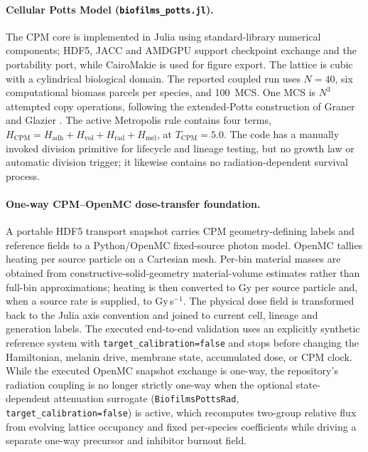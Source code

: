 \documentclass[11pt]{article}
\begin{document}
\paragraph{Cellular Potts Model (\texttt{biofilms\_potts.jl}).}
The CPM core is implemented in Julia using standard-library numerical components; HDF5, JACC and
AMDGPU support checkpoint exchange and the portability port, while CairoMakie is used for figure
export. The lattice is cubic with a cylindrical biological domain. The reported coupled run uses
$N=40$, six computational biomass parcels per species, and 100~MCS. One MCS is $N^3$ attempted copy
operations, following the extended-Potts construction of Graner and Glazier \cite{graner1992}. The active Metropolis rule contains four terms,
$H_{\mathrm{CPM}}=H_{\mathrm{adh}}+H_{\mathrm{vol}}+H_{\mathrm{rad}}+H_{\mathrm{mel}}$, at
$T_{\mathrm{CPM}}=5.0$. The code has a manually invoked division primitive for lifecycle and
lineage testing, but no growth law or automatic division trigger; it likewise contains no
radiation-dependent survival process.

\paragraph{One-way CPM--OpenMC dose-transfer foundation.}
A portable HDF5 transport snapshot carries CPM geometry-defining labels and reference fields to a
Python/OpenMC fixed-source photon model. OpenMC tallies heating per source particle on a Cartesian
mesh. Per-bin material masses are obtained from constructive-solid-geometry material-volume
estimates rather than full-bin approximations; heating is then converted to Gy per source particle
and, when a source rate is supplied, to Gy\,s$^{-1}$. The physical dose field is transformed back to
the Julia axis convention and joined to current cell, lineage and generation labels. The executed
end-to-end validation uses an explicitly synthetic reference system with
\texttt{target\_calibration=false} and stops before changing the Hamiltonian, melanin drive,
membrane state, accumulated dose, or CPM clock. While the executed OpenMC snapshot exchange is one-way, the repository's radiation coupling is no longer strictly one-way when the optional state-dependent attenuation surrogate (\texttt{BiofilmsPottsRad}, \texttt{target\_calibration=false}) is active, which recomputes two-group relative flux from evolving lattice occupancy and fixed per-species coefficients while driving a separate one-way precursor and inhibitor burnout field.
\end{document}

